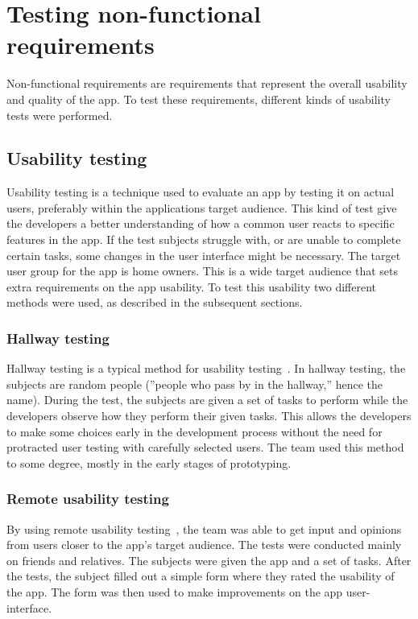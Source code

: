 \section{Testing non-functional requirements}
\label{sec:testingnonfunctionalrequirements}
Non-functional requirements are requirements that represent the overall usability and quality of the app. To test these requirements, different kinds of usability tests were performed.

\subsection{Usability testing}
\label{sec:userTest}
Usability testing is a technique used to evaluate an app by testing it on actual users, preferably within the applications target audience. This kind of test give the developers a better understanding of how a common user reacts to specific features in the app. If the test subjects struggle with, or are unable to complete certain tasks, some changes in the user interface might be necessary.
The target user group for the app is home owners. This is a wide target audience that sets extra requirements on the app usability. To test this usability two different methods were used, as described in the subsequent sections.

\subsubsection{Hallway testing}
Hallway testing is a typical method for usability testing~\cite{hallwaytesting}. In hallway testing, the subjects are random people (''people who pass by in the hallway,'' hence the name). During the test, the subjects are given a set of tasks to perform while the developers observe how they perform their given tasks. This allows the developers to make some choices early in the development process without the need for protracted user testing with carefully selected users. The team used this method to some degree, mostly in the early stages of prototyping.

\subsubsection{Remote usability testing}
By using remote usability testing~\cite{remoteTest}, the team was able to get input and opinions from users closer to the app's target audience.
The tests were conducted mainly on friends and relatives. The subjects were given the app and a set of tasks. After the tests, the subject filled out a simple form where they rated the usability of the app. The form was then used to make improvements on the app user-interface.

